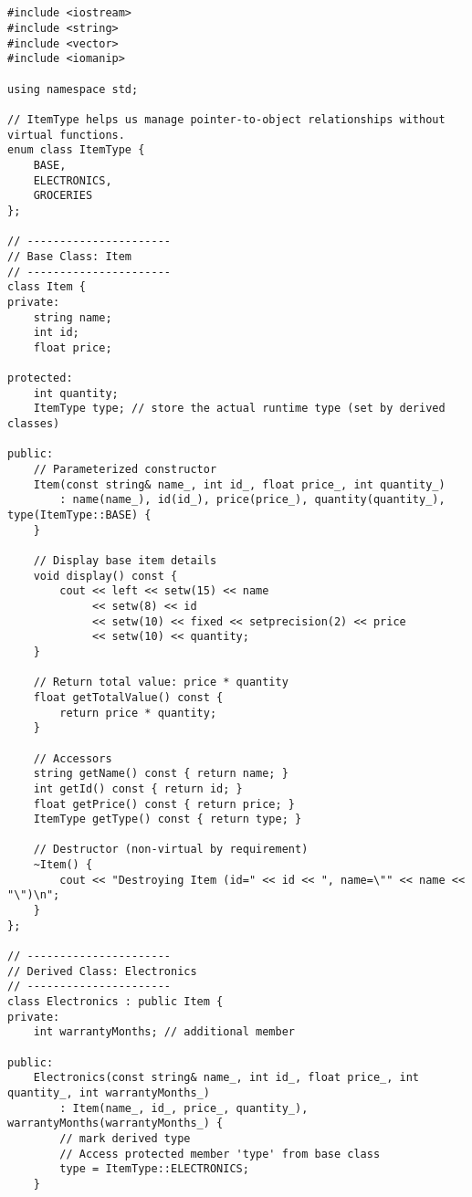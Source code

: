 \documentclass[12pt,a4paper]{article}
\begin{document}
\subsection{}
\begin{lstlisting}
#include <iostream>
#include <string>
#include <vector>
#include <iomanip>

using namespace std;

// ItemType helps us manage pointer-to-object relationships without virtual functions.
enum class ItemType {
    BASE,
    ELECTRONICS,
    GROCERIES
};

// ----------------------
// Base Class: Item
// ----------------------
class Item {
private:
    string name;
    int id;
    float price;

protected:
    int quantity;
    ItemType type; // store the actual runtime type (set by derived classes)

public:
    // Parameterized constructor
    Item(const string& name_, int id_, float price_, int quantity_)
        : name(name_), id(id_), price(price_), quantity(quantity_), type(ItemType::BASE) {
    }

    // Display base item details
    void display() const {
        cout << left << setw(15) << name
             << setw(8) << id
             << setw(10) << fixed << setprecision(2) << price
             << setw(10) << quantity;
    }

    // Return total value: price * quantity
    float getTotalValue() const {
        return price * quantity;
    }

    // Accessors
    string getName() const { return name; }
    int getId() const { return id; }
    float getPrice() const { return price; }
    ItemType getType() const { return type; }

    // Destructor (non-virtual by requirement)
    ~Item() {
        cout << "Destroying Item (id=" << id << ", name=\"" << name << "\")\n";
    }
};

// ----------------------
// Derived Class: Electronics
// ----------------------
class Electronics : public Item {
private:
    int warrantyMonths; // additional member

public:
    Electronics(const string& name_, int id_, float price_, int quantity_, int warrantyMonths_)
        : Item(name_, id_, price_, quantity_), warrantyMonths(warrantyMonths_) {
        // mark derived type
        // Access protected member 'type' from base class
        type = ItemType::ELECTRONICS;
    }


\end{lstlisting}
\end{document}
